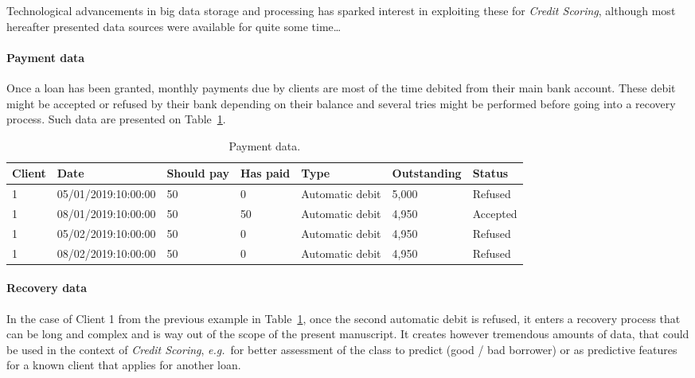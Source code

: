 Technological advancements in big data storage and processing has sparked interest in exploiting these for \textit{Credit Scoring}, although most hereafter presented data sources were available for quite some time\dots

\paragraph{Payment data}

Once a loan has been granted, monthly payments due by clients are most of the time debited from their main bank account. These debit might be accepted or refused by their bank depending on their balance and several tries might be performed before going into a recovery process. Such data are presented on Table~\ref{tab:payment_data}.

\begin{table}[ht]
    \centering
    \caption{Payment data.}
    \label{tab:payment_data}
    \begin{small}
\begin{tabular}{lllllll}
Client & Date & Should pay & Has paid & Type & Outstanding & Status \\
 \hline
1 & 05/01/2019:10:00:00 & 50 & 0 & Automatic debit & 5{,}000 & Refused \\
1 & 08/01/2019:10:00:00 & 50 & 50 & Automatic debit & 4{,}950 & Accepted \\
1 & 05/02/2019:10:00:00 & 50 & 0 & Automatic debit & 4{,}950 & Refused \\
1 & 08/02/2019:10:00:00 & 50 & 0 & Automatic debit & 4{,}950 & Refused
\end{tabular}
    \end{small}
\end{table}


\paragraph{Recovery data}

In the case of Client 1 from the previous example in Table~\ref{tab:payment_data}, once the second automatic debit is refused, it enters a recovery process that can be long and complex and is way out of the scope of the present manuscript. It creates however tremendous amounts of data, that could be used in the context of \textit{Credit Scoring}, \textit{e.g.}\ for better assessment of the class to predict (good / bad borrower) or as predictive features for a known client that applies for another loan.

